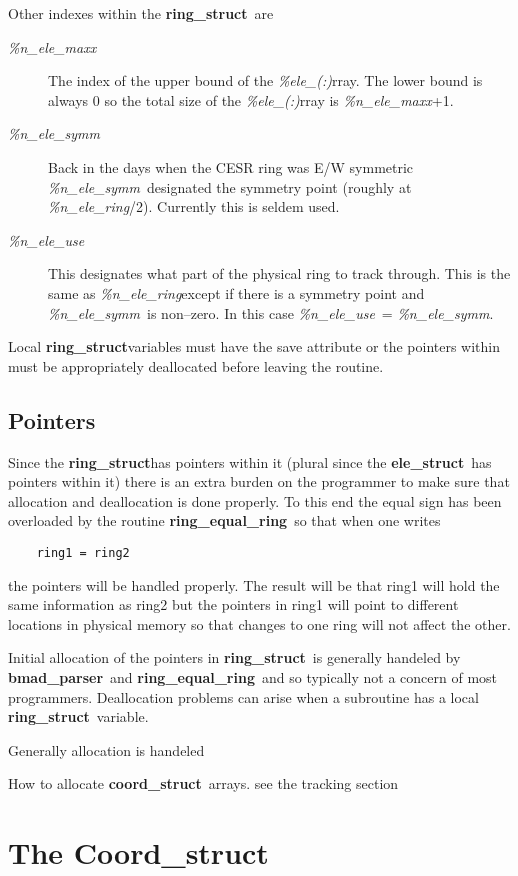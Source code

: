 \documentclass{book}
\newcommand{\ringstruct}{{\bf ring\_struct}}
\newcommand{\elestruct}{{\bf ele\_struct}}
\newcommand{\coordstruct}{{\bf coord\_struct}}
\newcommand{\ringequalring}{{\bf ring\_equal\_ring}}
\newcommand{\bmadparser}{{\bf bmad\_parser}}
\newcommand{\ele}[2]{{\sl \%ele\_(#1)}}
\newcommand{\nelemaxx}{{\sl \%n\_ele\_maxx}}
\newcommand{\nelesymm}{{\sl \%n\_ele\_symm}}
\newcommand{\neleuse}{{\sl \%n\_ele\_use}}
\newcommand{\nelering}{{\sl \%n\_ele\_ring}}
\begin{document}
Other indexes within the \ringstruct\ are
\begin{description}
\item[\nelemaxx] The index of the upper bound of the \ele{:} array.
The lower bound is always 0 so the total size of the \ele{:} array is
\nelemaxx+1.
\item[\nelesymm] Back in the days when the CESR ring was E/W 
symmetric \nelesymm\ designated the symmetry point (roughly at \nelering/2). 
Currently this is seldem used.
\item[\neleuse] This designates what part of the physical ring to track 
through. This is the same as \nelering except if there is a symmetry point and \nelesymm\ is non--zero. In this case \neleuse\ = \nelesymm.
\end{description}

Local \ringstruct variables must have the save attribute or the
pointers within must be appropriately deallocated before leaving the
routine.

\section{Pointers}

Since the \ringstruct has pointers within it (plural since the \elestruct\
has pointers within it) there is an extra burden on the programmer to
make sure that allocation and deallocation is done properly. To this
end the equal sign has been overloaded by the routine \ringequalring\
so that when one writes
\begin{verbatim}
    ring1 = ring2
\end{verbatim}
the pointers will be handled properly. The result will be that ring1
will hold the same information as ring2 but the pointers in ring1 will
point to different locations in physical memory so that changes to one
ring will not affect the other.

Initial allocation of the pointers in \ringstruct\ is generally
handeled by \bmadparser\ and \ringequalring\ and so typically not a
concern of most programmers. Deallocation problems can arise when a
subroutine has a local \ringstruct\ variable. 



Generally allocation is handeled

How to allocate \coordstruct\ arrays. see the tracking section


\chapter{The Coord\_struct}
\end{document}
